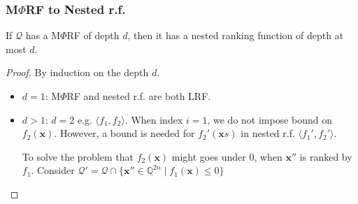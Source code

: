 \documentclass[11pt]{beamer}
\begin{document}
\begin{frame}\frametitle{M$\Phi$RF to Nested r.f.}
\begin{theorem}[1]
If $\mathcal{Q}$ has a M$\Phi$RF of depth $d$, then it has a nested ranking function of depth at most $d$.


\end{theorem}

\begin{proof}
By induction on the depth $d$.
\begin{itemize}
\item $d = 1$: M$\Phi$RF and nested r.f. are both LRF.
\item $d > 1$: $d = 2$ e.g.
$\langle f_1, f_2\rangle$. When index $i = 1$, we do not impose bound on $f_2(\textbf{x})$. However, a bound is needed for $f_2'(\textbf{x}s)$ in nested r.f. $\langle f_1', f_2'\rangle$.

To solve the problem that $f_2(\textbf{x})$ might goes under $0$, when $\textbf{x}''$ is ranked by $f_1$. Consider  $\mathcal{Q}' = \mathcal{Q}\cap \{\textbf{x}''\in \mathbb{Q}^{2n}\mid f_1(\textbf{x}) \le 0\}$


\end{itemize}


\end{proof}

\end{frame}
\end{document}
